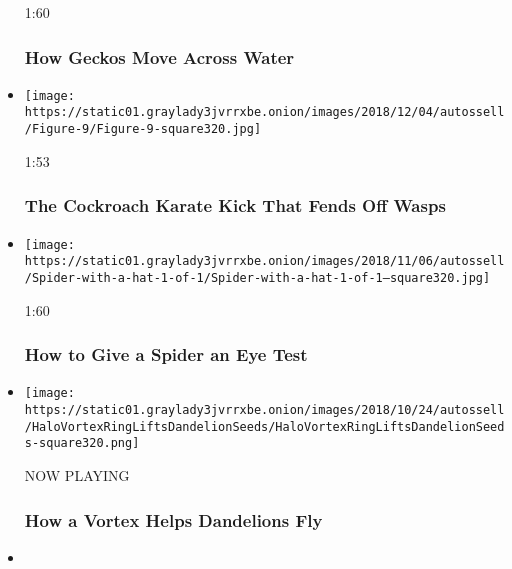 \begin{itemize}
  1:60

  \hypertarget{how-geckos-move-across-water}{%
  \subsubsection{How Geckos Move Across
  Water}\label{how-geckos-move-across-water}}
\item
  \href{https://www.nytimes3xbfgragh.onion/video/science/100000006213475/the-cockroach-karate-kick-that-fends-off-wasps.html?action=click\&module=video-series-bar\&region=header\&pgtype=Article\&playlistId=video/sciencetake}{}

  \texttt{[image: https://static01.graylady3jvrrxbe.onion/images/2018/12/04/autossell/Figure-9/Figure-9-square320.jpg]}

  1:53

  \hypertarget{the-cockroach-karate-kick-that-fends-off-wasps}{%
  \subsubsection{The Cockroach Karate Kick That Fends Off
  Wasps}\label{the-cockroach-karate-kick-that-fends-off-wasps}}
\item
  \href{https://www.nytimes3xbfgragh.onion/video/science/100000006182460/how-to-give-a-spider-an-eye-test.html?action=click\&module=video-series-bar\&region=header\&pgtype=Article\&playlistId=video/sciencetake}{}

  \texttt{[image: https://static01.graylady3jvrrxbe.onion/images/2018/11/06/autossell/Spider-with-a-hat-1-of-1/Spider-with-a-hat-1-of-1--square320.jpg]}

  1:60

  \hypertarget{how-to-give-a-spider-an-eye-test}{%
  \subsubsection{How to Give a Spider an Eye
  Test}\label{how-to-give-a-spider-an-eye-test}}
\item
  \texttt{[image: https://static01.graylady3jvrrxbe.onion/images/2018/10/24/autossell/HaloVortexRingLiftsDandelionSeeds/HaloVortexRingLiftsDandelionSeeds-square320.png]}

  NOW PLAYING

  \hypertarget{how-a-vortex-helps-dandelions-fly-2}{%
  \subsubsection{How a Vortex Helps Dandelions
  Fly}\label{how-a-vortex-helps-dandelions-fly-2}}
\item
  \href{https://www.nytimes3xbfgragh.onion/video/science/100000006102476/frog-jump-study.html?action=click\&module=video-series-bar\&region=header\&pgtype=Article\&playlistId=video/sciencetake}{}


\end{itemize}
